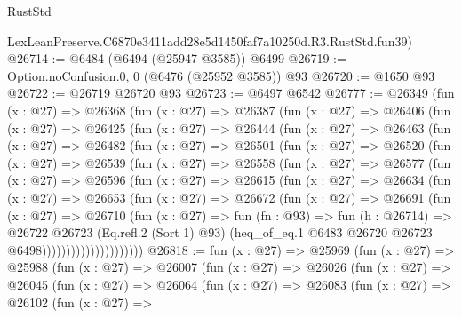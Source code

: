 \begin{lexlean}{RustStd}
\begin{coremodule}
    LexLeanPreserve.C6870e3411add28e5d1450faf7a10250d.R3.RustStd.fun39)
@26714 := @6484 (@6494 (@25947 @3585)) @6499
@26719 := Option.noConfusion.{0, 0} (@6476 (@25952 @3585)) @93
@26720 := @1650 @93
@26722 := @26719 @26720 @93
@26723 := @6497 @6542
@26777 := @26349
    (fun (x : @27) =>
    @26368
      (fun (x : @27) =>
      @26387
        (fun (x : @27) =>
        @26406
          (fun (x : @27) =>
          @26425
            (fun (x : @27) =>
            @26444
              (fun (x : @27) =>
              @26463
                (fun (x : @27) =>
                @26482
                  (fun (x : @27) =>
                  @26501
                    (fun (x : @27) =>
                    @26520
                      (fun (x : @27) =>
                      @26539
                        (fun (x : @27) =>
                        @26558
                          (fun (x : @27) =>
                          @26577
                            (fun (x : @27) =>
                            @26596
                              (fun (x : @27) =>
                              @26615
                                (fun (x : @27) =>
                                @26634
                                  (fun (x : @27) =>
                                  @26653
                                    (fun (x : @27) =>
                                    @26672
                                      (fun (x : @27) =>
                                      @26691
                                        (fun (x : @27) =>
                                        @26710
                                          (fun (x : @27) =>
                                          fun (fn : @93) =>
                                          fun (h : @26714) =>
                                          @26722
                                            @26723
                                            (Eq.refl.{2} (Sort 1) @93)
                                            (heq_of_eq.{1}
                                              @6483
                                              @26720
                                              @26723
                                              @6498)))))))))))))))))))))
@26818 := fun (x : @27) =>
  @25969
    (fun (x : @27) =>
    @25988
      (fun (x : @27) =>
      @26007
        (fun (x : @27) =>
        @26026
          (fun (x : @27) =>
          @26045
            (fun (x : @27) =>
            @26064
              (fun (x : @27) =>
              @26083
                (fun (x : @27) =>
                @26102
                  (fun (x : @27) =>

\end{coremodule}
\end{lexlean}
